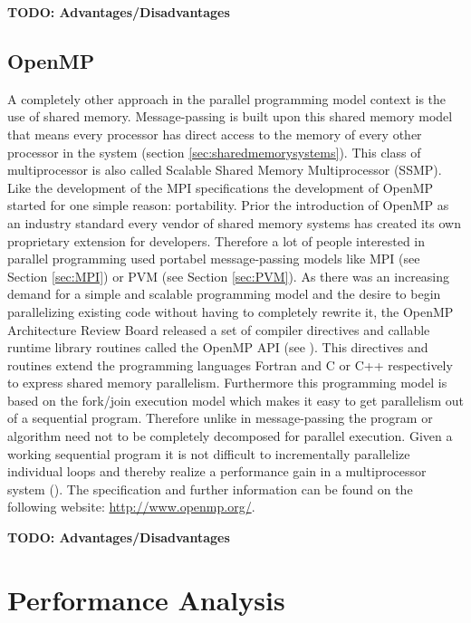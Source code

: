 \textbf{TODO: Advantages/Disadvantages}


\subsection{OpenMP}
\label{sec:OpenMP}

A completely other approach in the parallel programming model context
is the use of shared memory. Message-passing is built upon this shared
memory model that means every processor has direct access to the
memory of every other processor in the system (section \ref{sec:sharedmemorysystems}). This class of
multiprocessor is also called Scalable Shared Memory Multiprocessor
(SSMP). Like the development of the MPI specifications the development
of OpenMP started for one simple reason: portability. Prior the
introduction of OpenMP as an industry standard every vendor of shared
memory systems has created its own proprietary extension for
developers. Therefore a lot of people interested in parallel
programming used portabel message-passing models like MPI (see
Section \ref{sec:MPI}) or PVM (see Section \ref{sec:PVM}). As there
was an increasing demand for a simple and scalable programming model and
the desire to begin parallelizing existing code without having to
completely rewrite it, the OpenMP Architecture Review Board released a
set of compiler directives and callable runtime library routines
called the OpenMP API (see \cite{openMP05}). This directives and routines extend the
programming languages Fortran and C or C++ respectively to express
shared memory parallelism.
Furthermore this programming model is based on the fork/join execution
model which makes it easy to get parallelism out of a sequential
program. Therefore unlike in message-passing the program or algorithm
need not to be completely decomposed for parallel execution. Given a
working sequential program it is not difficult to incrementally
parallelize individual loops and thereby realize a performance gain in
a multiprocessor system (\cite{dagum1997opi}). The specification and
further information can be found on the following website:
\url{http://www.openmp.org/}.

\textbf{TODO: Advantages/Disadvantages}


\section{Performance Analysis}
\label{sec:perf_analysis}

